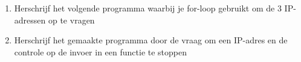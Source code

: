 \begin{enumerate}
\item Herschrijf het volgende programma waarbij je for-loop gebruikt om de 3 IP-adressen op te vragen

\item Herschrijf het gemaakte programma door de vraag om een IP-adres en de controle op de invoer in een functie te stoppen
\end{enumerate}
